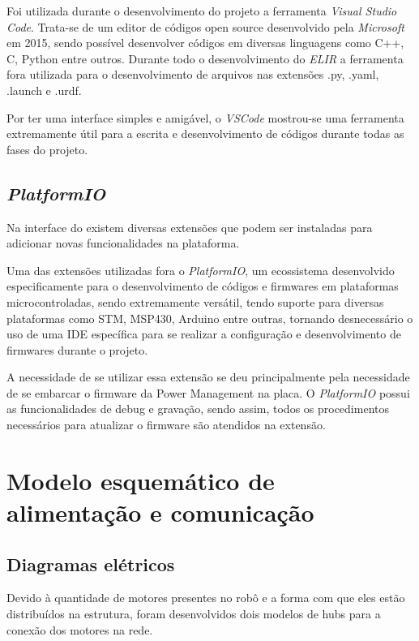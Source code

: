 Foi utilizada durante o desenvolvimento do projeto a ferramenta \textit{Visual Studio Code}. Trata-se de um editor de códigos open source desenvolvido pela \textit{Microsoft} em 2015, sendo possível desenvolver códigos em diversas linguagens como C++, C, Python entre outros. Durante todo o desenvolvimento do \textit{ELIR} a ferramenta fora utilizada para o desenvolvimento de arquivos nas extensões .py, .yaml, .launch e .urdf.  

Por ter uma interface simples e amigável, o \textit{VSCode} mostrou-se uma ferramenta extremamente útil para a escrita e desenvolvimento de códigos durante todas as fases do projeto. 

\subsection{\textit{PlatformIO}}
Na interface do \textit{} existem diversas extensões que podem ser instaladas para adicionar novas funcionalidades na plataforma.

Uma das extensões utilizadas fora o \textit{PlatformIO}, um ecossistema desenvolvido especificamente para o desenvolvimento de códigos e firmwares em plataformas microcontroladas, sendo extremamente versátil, tendo suporte para diversas plataformas como STM, MSP430, Arduino entre outras, tornando desnecessário o uso de uma IDE específica para se realizar a configuração e desenvolvimento de firmwares durante o projeto.

A necessidade de se utilizar essa extensão se deu principalmente pela necessidade de se embarcar o firmware da Power Management na placa. O \textit{PlatformIO} possui as funcionalidades de debug e gravação, sendo assim, todos os procedimentos necessários para atualizar o firmware são atendidos na extensão.





\section{Modelo esquemático de alimentação e comunicação}
\label{sec:modesq}


\subsection{Diagramas elétricos}
\label{sec:diage}
Devido à quantidade de motores presentes no robô e a forma com que eles estão distribuídos na estrutura, foram desenvolvidos dois modelos de hubs para a conexão dos motores na rede.

